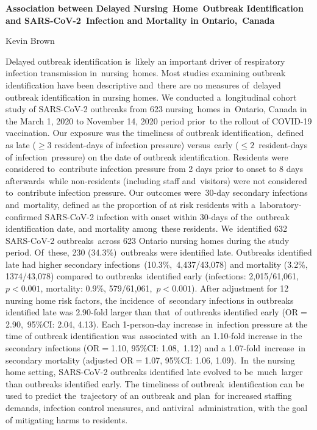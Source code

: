 
{\bfseries
Association between Delayed Nursing Home Outbreak Identification and
SARS-CoV-2 Infection and Mortality in Ontario, Canada

Kevin Brown
}

Delayed outbreak identification is likely an important driver of respiratory
infection transmission in nursing homes. Most studies examining outbreak
identification have been descriptive and there are no measures of delayed
outbreak identification in nursing homes. We conducted a longitudinal cohort
study of SARS-CoV-2 outbreaks from 623 nursing homes in Ontario, Canada in the
March 1, 2020 to November 14, 2020 period prior to the rollout of COVID-19
vaccination. Our exposure was the timeliness of outbreak identification, defined
as late ($\ge3$ resident-days of infection pressure) versus early
($\le2$ resident-days of infection pressure) on the date of outbreak
identification. Residents were considered to contribute infection pressure from
2 days prior to onset to 8 days afterwards while non-residents (including staff
and visitors) were not considered to contribute infection pressure. Our outcomes
were 30-day secondary infections and mortality, defined as the proportion of at
risk residents with a laboratory-confirmed SARS-CoV-2 infection with onset
within 30-days of the outbreak identification date, and mortality among these
residents. We identified 632 SARS-CoV-2 outbreaks across 623 Ontario nursing
homes during the study period. Of these, 230 (34.3\%) outbreaks were identified
late. Outbreaks identified late had higher secondary
infections (10.3\%, 4,437/43,078) and mortality (3.2\%, 1374/43,078) compared to
outbreaks identified early (infections: 2,015/61,061, $p<0.001$, mortality: 0.9\%,
579/61,061, $p<0.001$). After adjustment for 12 nursing home risk factors, the
incidence of secondary infections in outbreaks identified late was 2.90-fold
larger than that of outbreaks identified early (OR$=$2.90, 95\%CI: 2.04, 4.13).
Each 1-person-day increase in infection pressure at the time of outbreak
identification was associated with an 1.10-fold increase in the secondary
infections (OR$=$1.10, 95\%CI: 1.08, 1.12) and a 1.07-fold increase in secondary
mortality (adjusted OR$=$1.07, 95\%CI: 1.06, 1.09). In the nursing home setting,
SARS-CoV-2 outbreaks identified late evolved to be much larger than outbreaks
identified early. The timeliness of outbreak identification can be used to
predict the trajectory of an outbreak and plan for increased staffing demands,
infection control measures, and antiviral administration, with the goal of
mitigating harms to residents.
